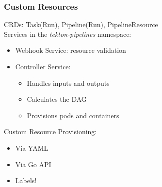 \documentclass[aspectratio=169,11pt,hyperref={colorlinks=true}]{beamer}
\begin{document}
\begin{lblackrwhiteframe}
\begin{blackframe}
\begin{grayframe}
  \frametitle{Custom Resources}
  CRDs: Task(Run), Pipeline(Run), PipelineResource \\
  \vspace{3ex}
  Services in the {\em tekton-pipelines} namespace:
  \begin{itemize}
    \item Webhook Service: resource validation
    \item Controller Service:
    \begin{itemize}
      \item Handles inputs and outputs
      \item Calculates the DAG
      \item Provisions pods and containers
    \end{itemize}
  \end{itemize}
  \vspace{3ex}
  Custom Resource Provisioning:
  \begin{itemize}
    \item Via YAML
    \item Via Go API
    \item Labels!
  \end{itemize}
\end{grayframe}


\end{blackframe}
\end{lblackrwhiteframe}
\end{document}
